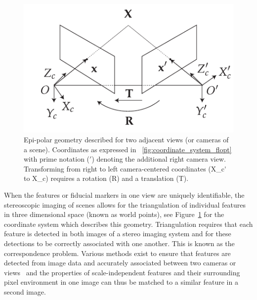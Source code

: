 \documentclass{osa-article}
\begin{document}
\begin{figure}
  \centering
  \includegraphics{./figures/epi-polar-geom}
  \caption[Epi-polar geometry described for two adjacent views]{
  Epi-polar geometry described for two adjacent views (or cameras of a scene).
  Coordinates as expressed in \figurename~\ref{fig:coordinate_system_flopt} with prime notation (\('\)) denoting the additional right camera view.
  Transforming from right to left camera-centered coordinates (\gls*{X_c'} to \gls*{X_c}) requires a rotation (\gls*{R}) and a translation (\gls*{T}).
  }\label{fig:epi-polar-geom}
\end{figure}




When the features or fiducial markers in one view are uniquely identifiable, the stereoscopic imaging of scenes allows for the triangulation of individual features in three dimensional space (known as world points), see Figure~\ref{fig:epi-polar-geom} for the coordinate system which describes this geometry. %
Triangulation requires that each feature is detected in both images of a stereo imaging system and for these detections to be correctly associated with one another.
This is known as the correspondence problem.
Various methods exist to ensure that features are detected from image data and accurately associated between two cameras or views~\cite{szeliskiComputerVisionAlgorithms2010} and the properties of scale-independent features and their surrounding pixel environment in one image can thus be matched to a similar feature in a second image.
\end{document}
